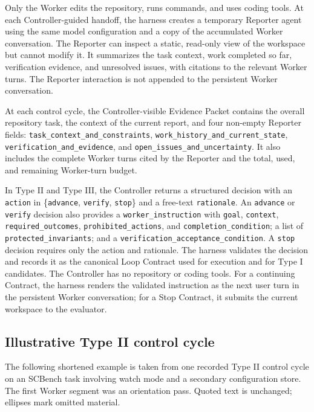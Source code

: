Only the Worker edits the repository, runs commands, and uses coding tools. At each Controller-guided handoff, the harness creates a temporary Reporter agent using the same model configuration and a copy of the accumulated Worker conversation. The Reporter can inspect a static, read-only view of the workspace but cannot modify it. It summarizes the task context, work completed so far, verification evidence, and unresolved issues, with citations to the relevant Worker turns. The Reporter interaction is not appended to the persistent Worker conversation.

At each control cycle, the Controller-visible Evidence Packet contains the overall repository task, the context of the current report, and four non-empty Reporter fields: \texttt{task\_\allowbreak context\_\allowbreak and\_\allowbreak constraints}, \texttt{work\_\allowbreak history\_\allowbreak and\_\allowbreak current\_\allowbreak state}, \texttt{verification\_\allowbreak and\_\allowbreak evidence}, and \texttt{open\_\allowbreak issues\_\allowbreak and\_\allowbreak uncertainty}. It also includes the complete Worker turns cited by the Reporter and the total, used, and remaining Worker-turn budget.

In Type II and Type III, the Controller returns a structured decision with an \texttt{action} in \{\texttt{advance}, \texttt{verify}, \texttt{stop}\} and a free-text \texttt{rationale}. An \texttt{advance} or \texttt{verify} decision also provides a \texttt{worker\_\allowbreak instruction} with \texttt{goal}, \texttt{context}, \texttt{required\_\allowbreak outcomes}, \texttt{prohibited\_\allowbreak actions}, and \texttt{completion\_\allowbreak condition}; a list of \texttt{protected\_\allowbreak invariants}; and a \texttt{verification\_\allowbreak acceptance\_\allowbreak condition}. A \texttt{stop} decision requires only the action and rationale. The harness validates the decision and records it as the canonical Loop Contract used for execution and for Type I candidates. The Controller has no repository or coding tools. For a continuing Contract, the harness renders the validated instruction as the next user turn in the persistent Worker conversation; for a Stop Contract, it submits the current workspace to the evaluator.

\subsection{Illustrative Type II control cycle}

The following shortened example is taken from one recorded Type II control cycle on an SCBench task involving watch mode and a secondary configuration store. The first Worker segment was an orientation pass. Quoted text is unchanged; ellipses mark omitted material.

